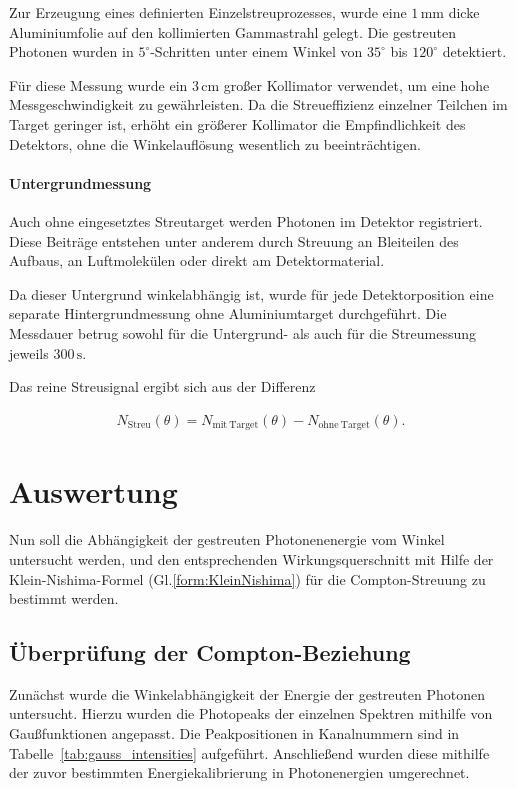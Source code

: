 Zur Erzeugung eines definierten Einzelstreuprozesses, wurde eine $1\,\mathrm{mm}$ dicke Aluminiumfolie auf den kollimierten Gammastrahl gelegt. 
Die gestreuten Photonen wurden in $5^\circ$-Schritten unter einem Winkel von $35^\circ$  bis $120^\circ$ detektiert. 

Für diese Messung wurde ein $3\,\mathrm{cm}$ großer Kollimator verwendet, um eine hohe Messgeschwindigkeit zu gewährleisten. 
Da die Streueffizienz einzelner Teilchen im Target geringer ist, erhöht ein größerer Kollimator die Empfindlichkeit des Detektors, ohne die Winkelauflösung wesentlich zu beeinträchtigen.

\paragraph{Untergrundmessung}

Auch ohne eingesetztes Streutarget werden Photonen im Detektor registriert. 
Diese Beiträge entstehen unter anderem durch Streuung an Bleiteilen des Aufbaus, an Luftmolekülen oder direkt am Detektormaterial.

Da dieser Untergrund winkelabhängig ist, wurde für jede Detektorposition eine separate Hintergrundmessung ohne Aluminiumtarget durchgeführt. 
Die Messdauer betrug sowohl für die Untergrund- als auch für die Streumessung jeweils $300\,\mathrm{s}$.

Das reine Streusignal ergibt sich aus der Differenz

\begin{align}
    N_\mathrm{Streu}(\theta)
    =
    N_\mathrm{mit\ Target}(\theta)
    -
    N_\mathrm{ohne\ Target}(\theta).
\end{align}

\section{Auswertung}

Nun soll die Abhängigkeit der gestreuten Photonenenergie vom Winkel untersucht werden, und den entsprechenden Wirkungsquerschnitt mit Hilfe der Klein-Nishima-Formel (Gl.\ref{form:KleinNishima}) für die Compton-Streuung zu bestimmt werden.

\subsection{Überprüfung der Compton-Beziehung}

Zunächst wurde die Winkelabhängigkeit der Energie der gestreuten Photonen untersucht. 
Hierzu wurden die Photopeaks der einzelnen Spektren mithilfe von Gaußfunktionen angepasst. 
Die Peakpositionen in Kanalnummern sind in Tabelle~\ref{tab:gauss_intensities} aufgeführt. 
Anschließend wurden diese mithilfe der zuvor bestimmten Energiekalibrierung in Photonenergien umgerechnet.

